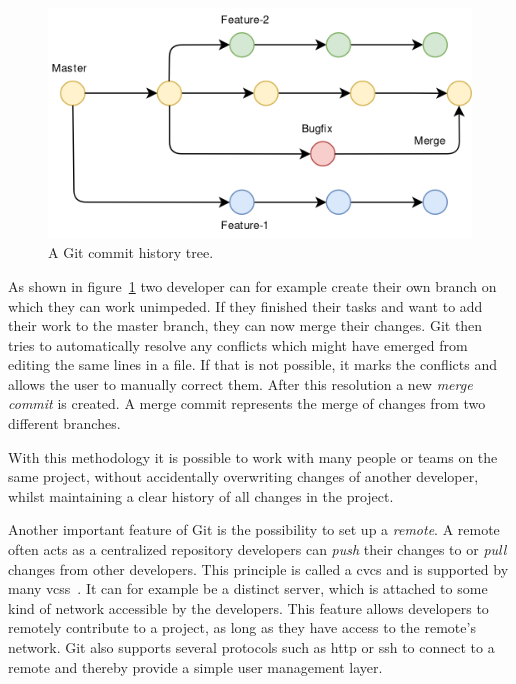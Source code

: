 \begin{figure}[H]
    \includegraphics[scale=0.35]{./graphs/git-history-branch}
    \centering
    \caption{A Git commit history tree.}\label{fig:git-commit-tree}
\end{figure}

As shown in figure~\ref{fig:git-commit-tree} two developer can for example create their own branch on which they can work unimpeded.
If they finished their tasks and want to add their work to the master branch, they can now merge their changes.
Git then tries to automatically resolve any conflicts which might have emerged from editing the same lines in a file.
If that is not possible, it marks the conflicts and allows the user to manually correct them.
After this resolution a new \emph{merge commit} is created.
A merge commit represents the merge of changes from two different branches.

With this methodology it is possible to work with many people or teams on the same project, without accidentally overwriting changes of another developer, whilst maintaining a clear history of all changes in the project.

Another important feature of Git is the possibility to set up a \emph{remote}.
A remote often acts as a centralized repository developers can \emph{push} their changes to or \emph{pull} changes from other developers.
This principle is called a \ac{cvcs} and is supported by many \acp{vcs}~\cite{version-control}.
It can for example be a distinct server, which is attached to some kind of network accessible by the developers.
This feature allows developers to remotely contribute to a project, as long as they have access to the remote's network.
Git also supports several protocols such as \ac{http} or \ac{ssh} to connect to a remote and thereby provide a simple user management layer.


